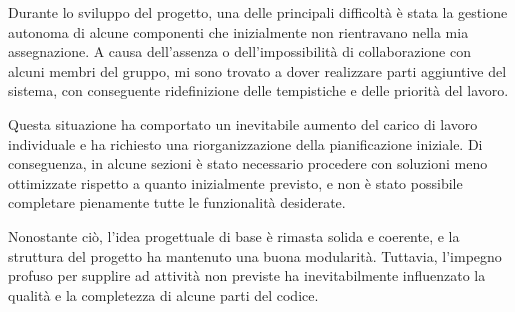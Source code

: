 \documentclass[a4paper,12pt]{report}
\begin{document}
Durante lo sviluppo del progetto, una delle principali difficoltà è stata la gestione autonoma di alcune componenti che inizialmente non rientravano nella mia assegnazione. A causa dell'assenza o dell'impossibilità di collaborazione con alcuni membri del gruppo, mi sono trovato a dover realizzare parti aggiuntive del sistema, con conseguente ridefinizione delle tempistiche e delle priorità del lavoro.

Questa situazione ha comportato un inevitabile aumento del carico di lavoro individuale e ha richiesto una riorganizzazione della pianificazione iniziale. Di conseguenza, in alcune sezioni è stato necessario procedere con soluzioni meno ottimizzate rispetto a quanto inizialmente previsto, e non è stato possibile completare pienamente tutte le funzionalità desiderate.

Nonostante ciò, l'idea progettuale di base è rimasta solida e coerente, e la struttura del progetto ha mantenuto una buona modularità. Tuttavia, l'impegno profuso per supplire ad attività non previste ha inevitabilmente influenzato la qualità e la completezza di alcune parti del codice.


\appendix
\end{document}
